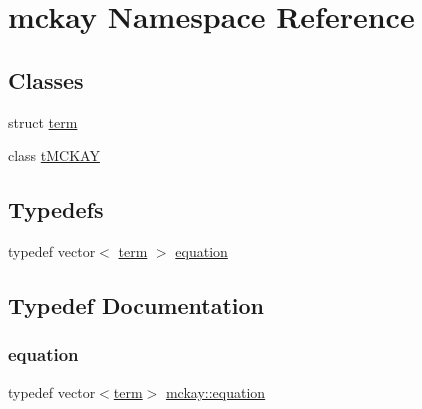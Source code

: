 \hypertarget{namespacemckay}{}\section{mckay Namespace Reference}
\label{namespacemckay}
\subsection*{Classes}
\begin{DoxyCompactItemize}
\item 
struct \mbox{\hyperlink{structmckay_1_1term}{term}}
\item 
class \mbox{\hyperlink{classmckay_1_1t_m_c_k_a_y}{t\+M\+C\+K\+AY}}
\end{DoxyCompactItemize}
\subsection*{Typedefs}
\begin{DoxyCompactItemize}
\item 
typedef vector$<$ \mbox{\hyperlink{structmckay_1_1term}{term}} $>$ \mbox{\hyperlink{namespacemckay_a4f7cb66ed07fe573b2b08e73ab462c1a}{equation}}
\end{DoxyCompactItemize}


\subsection{Typedef Documentation}
\mbox{\label{namespacemckay_a4f7cb66ed07fe573b2b08e73ab462c1a}} 
\subsubsection{\texorpdfstring{equation}{equation}}
{\footnotesize\ttfamily typedef vector$<$\mbox{\hyperlink{structmckay_1_1term}{term}}$>$ \mbox{\hyperlink{namespacemckay_a4f7cb66ed07fe573b2b08e73ab462c1a}{mckay\+::equation}}}

